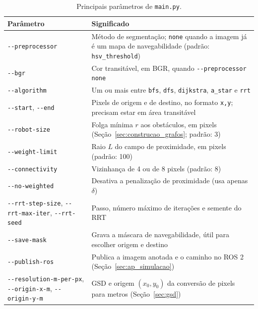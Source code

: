 \documentclass[
    12pt,
    openright,
    oneside,
    a4paper,
    english,
    brazil
]{abntex2}
\begin{document}
\begin{apendicesenv}
\begin{table}[H]
    \centering
    \caption{Principais parâmetros de \texttt{main.py}.}
    \label{tab:parametros_cli}
    \footnotesize
    \renewcommand{\arraystretch}{1.2}
    \begin{tabular}{>{\raggedright\arraybackslash}p{4.8cm} >{\raggedright\arraybackslash}p{10.0cm}}
        \toprule
        \textbf{Parâmetro} & \textbf{Significado} \\
        \midrule
        \texttt{-{}-preprocessor} & Método de segmentação; \texttt{none} quando a imagem já é um mapa de navegabilidade (padrão: \texttt{hsv\_threshold}) \\
        \texttt{-{}-bgr} & Cor transitável, em BGR, quando \texttt{-{}-preprocessor none} \\
        \texttt{-{}-algorithm} & Um ou mais entre \texttt{bfs}, \texttt{dfs}, \texttt{dijkstra}, \texttt{a\_star} e \texttt{rrt} \\
        \texttt{-{}-start}, \texttt{-{}-end} & Pixels de origem e de destino, no formato \texttt{x,y}; precisam estar em área transitável \\
        \texttt{-{}-robot-size} & Folga mínima $r$ aos obstáculos, em pixels (Seção~\ref{sec:construcao_grafos}; padrão: 3) \\
        \texttt{-{}-weight-limit} & Raio $L$ do campo de proximidade, em pixels (padrão: 100) \\
        \texttt{-{}-connectivity} & Vizinhança de 4 ou de 8 pixels (padrão: 8) \\
        \texttt{-{}-no-weighted} & Desativa a penalização de proximidade (usa apenas $\delta$) \\
        \texttt{-{}-rrt-step-size}, \texttt{-{}-rrt-max-iter}, \texttt{-{}-rrt-seed} & Passo, número máximo de iterações e semente do RRT \\
        \texttt{-{}-save-mask} & Grava a máscara de navegabilidade, útil para escolher origem e destino \\
        \texttt{-{}-publish-ros} & Publica a imagem anotada e o caminho no ROS 2 (Seção~\ref{sec:ap_simulacao}) \\
        \texttt{-{}-resolution-m-per-px}, \texttt{-{}-origin-x-m}, \texttt{-{}-origin-y-m} & GSD e origem $(x_0, y_0)$ da conversão de pixels para metros (Seção~\ref{sec:gsd}) \\
        \bottomrule
    \end{tabular}
\end{table}


\end{apendicesenv}
\end{document}
